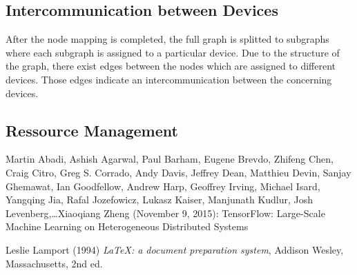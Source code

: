 \documentclass[ieeetran]{article}
\begin{document}
\subsection{Intercommunication between Devices} %
\label{sub:intercommunication_between_devices}
After the node mapping is completed, the full graph is splitted to subgraphs where each subgraph is assigned to a particular device. Due to the structure of the graph, there exist edges between the nodes which are assigned to different devices. Those edges indicate an intercommunication between the concerning devices. 




\subsection{Ressource Management} %
\label{sub:ressource_management}





\pagebreak
\begin{thebibliography}{9}
Martin Abadi, Ashish Agarwal, Paul Barham, Eugene Brevdo, Zhifeng Chen, Craig Citro, Greg S. Corrado, Andy Davis, Jeffrey Dean, Matthieu Devin, Sanjay Ghemawat, Ian Goodfellow, Andrew Harp, Geoffrey Irving, Michael Isard, Yangqing Jia, Rafal Jozefowicz, Lukasz Kaiser, Manjunath Kudlur, Josh Levenberg,\ldots Xiaoqiang Zheng (November 9, 2015): TensorFlow: Large-Scale Machine Learning on Heterogeneous Distributed Systems 

Leslie Lamport (1994) \emph{\LaTeX: a document preparation system}, Addison
Wesley, Massachusetts, 2nd ed.
\end{thebibliography}
\end{document}
